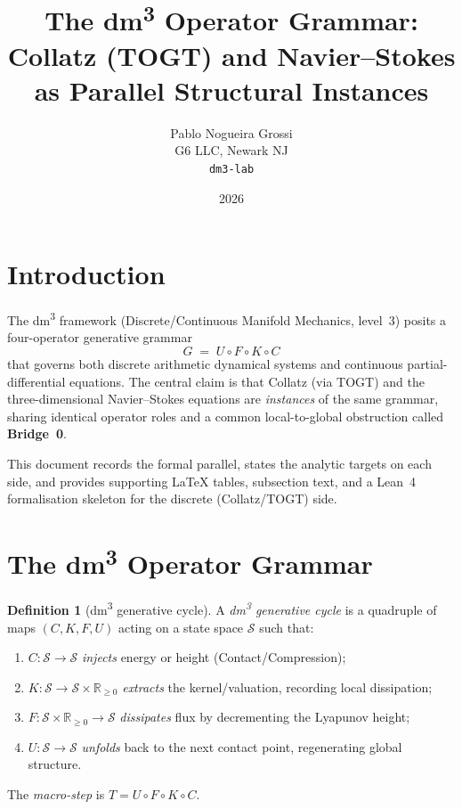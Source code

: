 \documentclass[11pt,a4paper]{article}
\title{The dm\textsuperscript{3} Operator Grammar:\\
       Collatz (TOGT) and Navier--Stokes\\
       as Parallel Structural Instances}
\author{Pablo Nogueira Grossi\\
        G6 LLC, Newark NJ\\
        \texttt{dm3-lab}}
\date{2026}
\theoremstyle{definition}
\newtheorem{defn}{Definition}
\theoremstyle{plain}
\begin{document}
\maketitle
\tableofcontents
\clearpage

\section{Introduction}

The dm\textsuperscript{3} framework (Discrete/Continuous Manifold Mechanics, level~3) posits a
four-operator generative grammar
\[
  G \;=\; U \circ F \circ K \circ C
\]
that governs both discrete arithmetic dynamical systems and continuous partial-differential
equations. The central claim is that Collatz (via TOGT) and the three-dimensional
Navier--Stokes equations are \emph{instances} of the same grammar, sharing identical operator
roles and a common local-to-global obstruction called \textbf{Bridge~0}.

This document records the formal parallel, states the analytic targets on each side, and
provides supporting LaTeX tables, subsection text, and a Lean~4 formalisation skeleton for
the discrete (Collatz/TOGT) side.

\section{The dm\textsuperscript{3} Operator Grammar}

\begin{defn}[dm\textsuperscript{3} generative cycle]
A \emph{dm\textsuperscript{3} generative cycle} is a quadruple of maps
$(C, K, F, U)$ acting on a state space $\mathcal{S}$ such that:
\begin{enumerate}
  \item $C : \mathcal{S} \to \mathcal{S}$ \emph{injects} energy or height (Contact/Compression);
  \item $K : \mathcal{S} \to \mathcal{S} \times \mathbb{R}_{\ge 0}$ \emph{extracts} the
        kernel/valuation, recording local dissipation;
  \item $F : \mathcal{S} \times \mathbb{R}_{\ge 0} \to \mathcal{S}$ \emph{dissipates} flux by
        decrementing the Lyapunov height;
  \item $U : \mathcal{S} \to \mathcal{S}$ \emph{unfolds} back to the next contact point,
        regenerating global structure.
\end{enumerate}
The \emph{macro-step} is $T = U \circ F \circ K \circ C$.
\end{defn}
\end{document}
